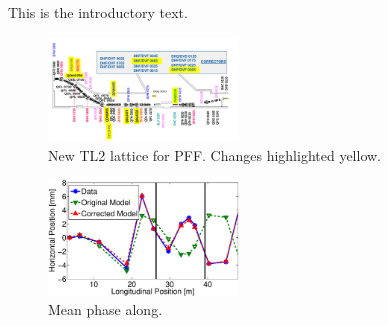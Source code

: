 
This is the introductory text.


\begin{figure}
  \centering
  \includegraphics[width=0.45\textwidth]{Figures/newTL2Lattice}
  \caption{New TL2 lattice for PFF. Changes highlighted yellow.}
  \label{f:newTL2Lattice}
\end{figure}



\begin{figure}
  \centering
  \includegraphics[width=0.45\textwidth]{Figures/opticsCorrVsOrig}
  \caption{Mean phase along.}
  \label{f:opticsCorrVsOrig}
\end{figure}





